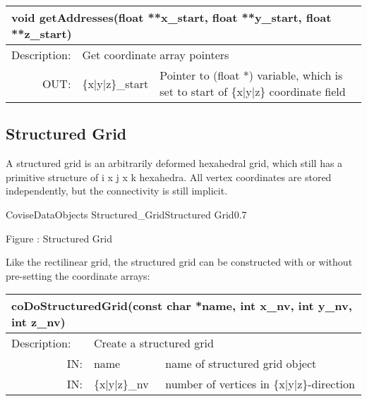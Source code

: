 \begin{htmlonly}
\begin{longtable}{|p{4cm}|p{2.5cm}|p{7cm}|}
\hline
\multicolumn{3}{|p{13.5cm}|}{\bf void getAddresses(float **x\_start, float **y\_start, 
                       float **z\_start)}\\
\hline
{Description:}  
           & \multicolumn{2}{p{9.5cm}|}{Get coordinate array pointers} \\
\hline
\multicolumn{1}{|r|}{OUT:} & \multicolumn{1}{p{3cm}|}{\{x|y|z\}\_start} 
                          & \multicolumn{1}{p{5cm}|}{Pointer to (float *) variable, 
			  which is set to start of \{x|y|z\} coordinate
			  field}\endhead
\hline
\end{longtable} 
\end{htmlonly}

\subsection{Structured Grid}

A structured grid is an arbitrarily deformed hexahedral grid, which still has a 
primitive structure of i x j x k hexahedra. All vertex coordinates are stored
independently, but the connectivity is still implicit.


\begin{covimg}{CoviseDataObjects}
		    {Structured_Grid}{Structured Grid}{0.7}\end{covimg}
\begin{htmlonly}
Figure : Structured Grid
\end{htmlonly} 
\vspace*{1cm}


Like the rectilinear grid, the structured grid can be 
constructed  with or 
without pre-setting the coordinate arrays:


\latexonly
\begin{longtable}{|p{4cm}|p{2.5cm}|p{7cm}|}
\hline
\multicolumn{3}{|p{13.5cm}|}{\bf coDoStructuredGrid(const char *name, int x\_nv, int y\_nv, int z\_nv)  }\\
\hline
{Description:}  
           & \multicolumn{2}{p{9.5cm}|}{Create a structured grid} \\
\hline
\multicolumn{1}{|r|}{IN:} & \multicolumn{1}{p{3cm}|}{name} 
                          & \multicolumn{1}{p{5cm}|}{name of structured grid object}\\
\hline
\multicolumn{1}{|r|}{IN:} & \multicolumn{1}{p{3cm}|}{\{x$\mid$y$\mid$z\}\_nv} 
                          & \multicolumn{1}{p{5cm}|}{number of vertices in 
			  \{x$\mid$y$\mid$z\}-direction}\endhead
\hline
\end{longtable}
\endlatexonly

